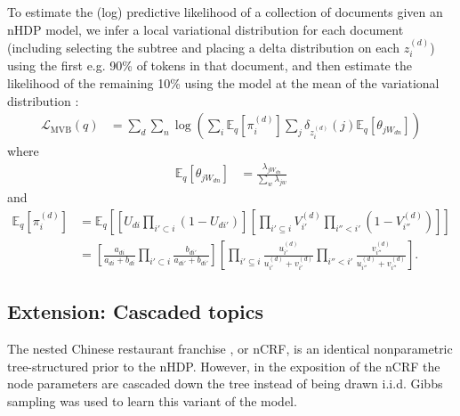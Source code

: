 \documentclass{article}
\newcommand{\Eq}{\ensuremath{\mathbb{E}_q\xspace}}
\newcommand{\LqMVB}{\ensuremath{\mathcal{L}_{\mathrm{MVB}}(q)}}
\newcommand{\leftsibling}{\ensuremath{<}}
\newcommand{\ancestor}{\ensuremath{\subset}}
\newcommand{\ancestoreq}{\ensuremath{\subseteq}}
\begin{document}
To estimate the (log) predictive likelihood of a collection of documents given an nHDP model, we infer a local variational distribution for each document (including selecting the subtree and placing a delta distribution on each $z_i^{(d)}$) using the first e.g. 90\% of tokens in that document, and then estimate the likelihood of the remaining 10\% using the model at the mean of the variational distribution \cite{wang2009a,teh2008,beal2003}:
\begin{align*}
    \LqMVB &= \sum_d \sum_n \log \left( \sum_i \Eq \left[ \pi_i^{(d)} \right] \sum_j \delta_{z_i^{(d)}}(j) \Eq \left[ \theta_{j W_{dn}} \right] \right)
\end{align*}
where
\begin{align*}
    \Eq \left[ \theta_{j W_{dn}} \right] &= \frac{\lambda_{j W_{dn}}}{\sum_w \lambda_{j w}}
\end{align*}
and
\begin{align*}
    \Eq \left[ \pi_i^{(d)} \right] &= \Eq \left[ \left[ U_{di} \prod_{i' \ancestor i}{\left(1 - U_{di'}\right)} \right] \left[ \prod_{i' \ancestoreq i} V_{i'}^{(d)} \prod_{i'' \leftsibling i'} \left(1 - V_{i''}^{(d)}\right) \right] \right] \\
        &= \left[ \frac{a_{di}}{a_{di} + b_{di}} \prod_{i' \ancestor i} \frac{b_{di'}}{a_{di'} + b_{di'}} \right] \left[ \prod_{i' \ancestoreq i} \frac{u^{(d)}_{i'}}{u^{(d)}_{i'} + v^{(d)}_{i'}} \prod_{i'' \leftsibling i'} \frac{v^{(d)}_{i''}}{u^{(d)}_{i''} + v^{(d)}_{i''}} \right] .
\end{align*}


\subsection*{Extension: Cascaded topics}

The nested Chinese restaurant franchise \cite{ahmed2013,ahmed2013a}, or nCRF, is an identical nonparametric tree-structured prior to the nHDP.  However, in the exposition of the nCRF the node parameters are cascaded down the tree instead of being drawn i.i.d.  Gibbs sampling was used to learn this variant of the model.
\end{document}
